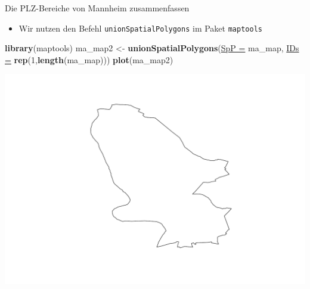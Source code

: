 \documentclass[ignorenonframetext,]{beamer}
\newenvironment{Shaded}{\begin{snugshade}}{\end{snugshade}}
\newcommand{\KeywordTok}[1]{\textcolor[rgb]{0.26,0.66,0.93}{\textbf{#1}}}
\newcommand{\DataTypeTok}[1]{\textcolor[rgb]{0.74,0.68,0.62}{\underline{#1}}}
\newcommand{\DecValTok}[1]{\textcolor[rgb]{0.27,0.67,0.26}{#1}}
\newcommand{\StringTok}[1]{\textcolor[rgb]{0.02,0.61,0.04}{#1}}
\newcommand{\NormalTok}[1]{\textcolor[rgb]{0.74,0.68,0.62}{#1}}
\providecommand{\tightlist}{%
  \setlength{\itemsep}{0pt}\setlength{\parskip}{0pt}}
\begin{document}
\begin{frame}[fragile]{Die PLZ-Bereiche von Mannheim zusammenfassen}

\begin{itemize}
\tightlist
\item
  Wir nutzen den Befehl \texttt{unionSpatialPolygons} im Paket
  \texttt{maptools}
\end{itemize}

\begin{Shaded}
\begin{Highlighting}[]
\KeywordTok{library}\NormalTok{(maptools)}
\NormalTok{ma_map2 <-}\StringTok{ }\KeywordTok{unionSpatialPolygons}\NormalTok{(}\DataTypeTok{SpP =}\NormalTok{ ma_map,}
                                \DataTypeTok{IDs =} \KeywordTok{rep}\NormalTok{(}\DecValTok{1}\NormalTok{,}\KeywordTok{length}\NormalTok{(ma_map)))}
\KeywordTok{plot}\NormalTok{(ma_map2)}
\end{Highlighting}
\end{Shaded}

\includegraphics{Geomedizin_files/figure-beamer/unnamed-chunk-96-1.pdf}

\end{frame}
\end{document}
